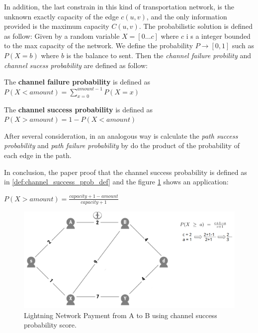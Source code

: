 In addition, the last constrain in this kind of transportation network, is the 
unknown exactly capacity of the edge $c(u, v)$, and the only information provided 
is the maximum capacity $C(u, v)$.
The probabilistic solution is defined as follow: Given by a random variable $X = [0 \dots c]$ where $c$ i
s a integer bounded to the max capacity of the network. We define the probability 
$P \rightarrow [0, 1]$ such as $P(X = b)$ where $b$ is the balance to sent.
Then the \emph{channel failure probility} and \emph{channel sucess probability} are defined as follow:

\begin{definition}
   The {\bf channel failure probability} is defined as $P(X < amount) = \sum_{x = 0}^{amount - 1} P(X = x)$ 
\end{definition}

\begin{definition}
    The {\bf channel success probability} is defined as $P(X > amount) = 1 -  P(X < amount)$
\end{definition}

After several consideration, in an analogous way is calculate the \emph{path success probability} and
\emph{path failure probability} by do the product of the probability of each edge in the path.

In conclusion, the paper proof that the channel success probability is defined as in 
\ref{def:channel_success_prob_def} and the figure \ref{fig:channel_success_prob_score}
shows an application: 

\begin{definition}
\label{def:channel_success_prob_def}
    $P(X > amount) = \frac{capacity + 1 - amount}{capacity + 1}$
\end{definition}


\begin{figure}[h]
  \begin{center}
  \includegraphics[width=0.6\columnwidth]{imgs/mincost_rene1.png}
  \end{center}
  \caption{Lightning Network Payment from A to B using channel success probability score.} 
  \label{fig:channel_success_prob_score}
\end{figure}


